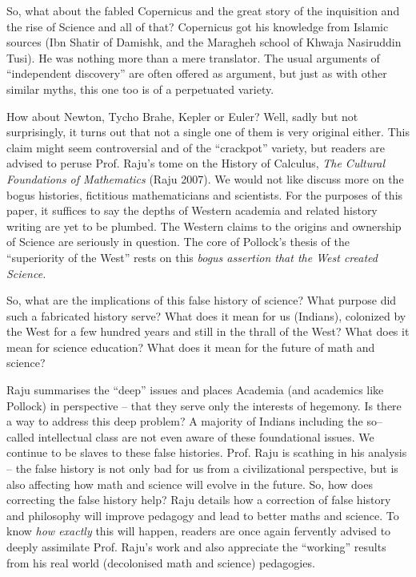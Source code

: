 So, what about the fabled Copernicus and the great story of the inquisition and the rise of Science and all of that? Copernicus got his knowledge from Islamic sources (Ibn Shatir of Damishk, and the Maragheh school of Khwaja Nasiruddin Tusi). He was nothing more than a mere translator. The usual arguments of “independent discovery” are often offered as argument, but just as with other similar myths, this one too is of a perpetuated variety.

How about Newton, Tycho Brahe, Kepler or Euler? Well, sadly but not surprisingly, it turns out that not a single one of them is very original either. This claim might seem controversial and of the “crackpot” variety, but readers are advised to peruse Prof. Raju’s tome on the History of Calculus, \textit{The Cultural Foundations of Mathematics} (Raju 2007). We would not like discuss more on the bogus histories, fictitious mathematicians and scientists. For the purposes of this paper, it suffices to say the depths of Western academia and related history writing are yet to be plumbed. The Western claims to the origins and ownership of Science are seriously in question. The core of Pollock’s thesis of the “superiority of the West” rests on this \textit{bogus assertion that the West created Science.}

So, what are the implications of this false history of science? What purpose did such a fabricated history serve? What does it mean for us (Indians), colonized by the West for a few hundred years and still in the thrall of the West? What does it mean for science education? What does it mean for the future of math and science?

Raju summarises the “deep” issues and places Academia (and academics like Pollock) in perspective – that they serve only the interests of hegemony. Is there a way to address this deep problem? A majority of Indians including the so–called intellectual class are not even aware of these foundational issues. We continue to be slaves to these false histories. Prof. Raju is scathing in his analysis – the false history is not only bad for us from a civilizational perspective, but is also affecting how math and science will evolve in the future. So, how does correcting the false history help? Raju details how a correction of false history and philosophy will improve pedagogy and lead to better maths and science. To know \textit{how exactly} this will happen, readers are once again fervently advised to deeply assimilate Prof. Raju’s work and also appreciate the “working” results from his real world (decolonised math and science) pedagogies.

